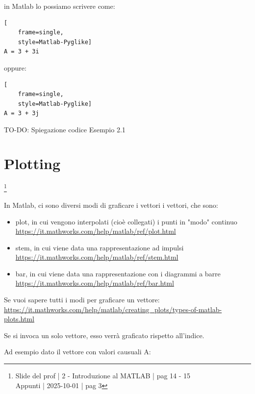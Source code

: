 in Matlab lo possiamo scrivere come: 

\begin{lstlisting}[
    frame=single,
    style=Matlab-Pyglike]
A = 3 + 3i
\end{lstlisting}

oppure: 

\begin{lstlisting}[
    frame=single,
    style=Matlab-Pyglike]
A = 3 + 3j
\end{lstlisting}

\begin{tcolorbox}[colback=green!5!white,colframe=green!75!black]
TO-DO: Spiegazione codice Esempio 2.1 
\end{tcolorbox} 

\newpage 

\section{Plotting}

\footnote{ 
    Slide del prof | 2 - Introduzione al MATLAB | pag 14 - 15\\
    Appunti | 2025-10-01 | pag 3
}

In Matlab, ci sono diversi modi di graficare i vettori i vettori, che sono: 

\begin{itemize}
    \item plot, in cui vengono interpolati (cioè collegati) i punti in "modo" continuo \url{https://it.mathworks.com/help/matlab/ref/plot.html} 
    \item stem, in cui viene data una rappresentazione ad impulsi \url{https://it.mathworks.com/help/matlab/ref/stem.html}
    \item bar, in cui viene data una rappresentazione con i diagrammi a barre \url{https://it.mathworks.com/help/matlab/ref/bar.html} 
\end{itemize}

\begin{tcolorbox}
    Se vuoi sapere tutti i modi per graficare un vettore: \url{https://it.mathworks.com/help/matlab/creating_plots/types-of-matlab-plots.html}
\end{tcolorbox}

Se si invoca un solo vettore, esso verrà graficato rispetto all'indice. \newline 

Ad esempio dato il vettore con valori causuali A: 

